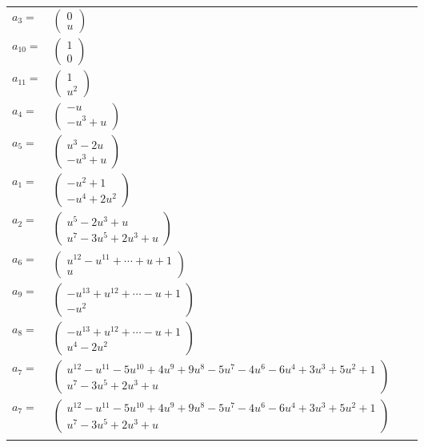 \documentclass[1p]{elsarticle_modified}
\theoremstyle{definition}
\begin{document}
\begin{tabular}{m{7pt} m{180pt} m{7pt} m{180pt} }
\flushright $a_{3}=$&$\begin{pmatrix}0\\u\end{pmatrix}$ \\
\flushright $a_{10}=$&$\begin{pmatrix}1\\0\end{pmatrix}$ \\
\flushright $a_{11}=$&$\begin{pmatrix}1\\u^2\end{pmatrix}$ \\
\flushright $a_{4}=$&$\begin{pmatrix}- u\\- u^3+u\end{pmatrix}$ \\
\flushright $a_{5}=$&$\begin{pmatrix}u^3-2 u\\- u^3+u\end{pmatrix}$ \\
\flushright $a_{1}=$&$\begin{pmatrix}- u^2+1\\- u^4+2 u^2\end{pmatrix}$ \\
\flushright $a_{2}=$&$\begin{pmatrix}u^5-2 u^3+u\\u^7-3 u^5+2 u^3+u\end{pmatrix}$ \\
\flushright $a_{6}=$&$\begin{pmatrix}u^{12}- u^{11}+\cdots+u+1\\u\end{pmatrix}$ \\
\flushright $a_{9}=$&$\begin{pmatrix}- u^{13}+u^{12}+\cdots- u+1\\- u^2\end{pmatrix}$ \\
\flushright $a_{8}=$&$\begin{pmatrix}- u^{13}+u^{12}+\cdots- u+1\\u^4-2 u^2\end{pmatrix}$ \\
\flushright $a_{7}=$&$\begin{pmatrix}u^{12}- u^{11}-5 u^{10}+4 u^9+9 u^8-5 u^7-4 u^6-6 u^4+3 u^3+5 u^2+1\\u^7-3 u^5+2 u^3+u\end{pmatrix}$\\ \flushright $a_{7}=$&$\begin{pmatrix}u^{12}- u^{11}-5 u^{10}+4 u^9+9 u^8-5 u^7-4 u^6-6 u^4+3 u^3+5 u^2+1\\u^7-3 u^5+2 u^3+u\end{pmatrix}$\\&\end{tabular}
\end{document}
